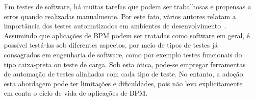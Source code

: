 \documentclass[12pt]{article}
\begin{document}


Em testes de software, há muitas tarefas que podem ser trabalhosas e propensas a erros quando realizadas manualmente. Por este fato, vários autores relatam a importância dos testes automatizados em ambientes de desenvolvimento~\cite{sbqs2013}. Assumindo que aplicações de BPM podem ser tratadas como software em geral, é possível testá-las sob diferentes aspectos, por meio de tipos de testes já consagrados em engenharia de software, como por exemplo testes funcionais do tipo caixa-preta ou teste de carga. Sob esta ótica, pode-se empregar ferramentas de automação de testes alinhadas com cada tipo de teste. No entanto, a adoção esta abordagem pode ter limitações e dificuldades, pois não leva explicitamente em conta o ciclo de vida de aplicações de BPM.


\end{document}
